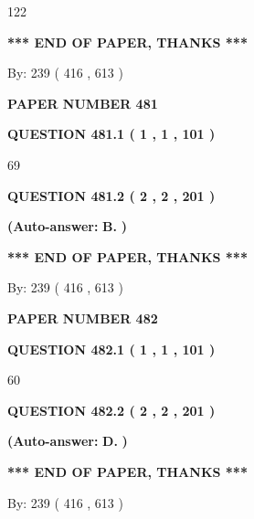 \documentclass{ctexart}
\begin{document}
122
   
   
   
   
\vspace{1.0in} 
{\textbf{\large{ *** END OF PAPER, THANKS *** }}} 
   
   
\hspace{1.0in} By: 
 239 ( 416 ,  613 )
   
   
   
   
\newpage 
\setcounter{page}{ 
   481001 } 
   
   
 {\textbf{ \Large{ PAPER NUMBER  481  }}}
   
   
   
   
  
  
{\textbf{\large{QUESTION
481.1 
 ( 1 , 1 , 101 )
}}}

69
  
  
{\textbf{\large{QUESTION
481.2 
 ( 2 , 2 , 201 )
}}}
 
 
{\textbf{(Auto-answer:}}
{\textbf{\large{
B.}}}
{\textbf{)}}
 
 
   
   
   
   
\vspace{1.0in} 
{\textbf{\large{ *** END OF PAPER, THANKS *** }}} 
   
   
\hspace{1.0in} By: 
 239 ( 416 ,  613 )
   
   
   
   
\newpage 
\setcounter{page}{ 
   482001 } 
   
   
 {\textbf{ \Large{ PAPER NUMBER  482  }}}
   
   
   
   
  
  
{\textbf{\large{QUESTION
482.1 
 ( 1 , 1 , 101 )
}}}

60
  
  
{\textbf{\large{QUESTION
482.2 
 ( 2 , 2 , 201 )
}}}
 
 
{\textbf{(Auto-answer:}}
{\textbf{\large{
D.}}}
{\textbf{)}}
 
 
   
   
   
   
\vspace{1.0in} 
{\textbf{\large{ *** END OF PAPER, THANKS *** }}} 
   
   
\hspace{1.0in} By: 
 239 ( 416 ,  613 )
   
   
   
   
\newpage 
\setcounter{page}{ 
   483001 } 
   
\end{document}
